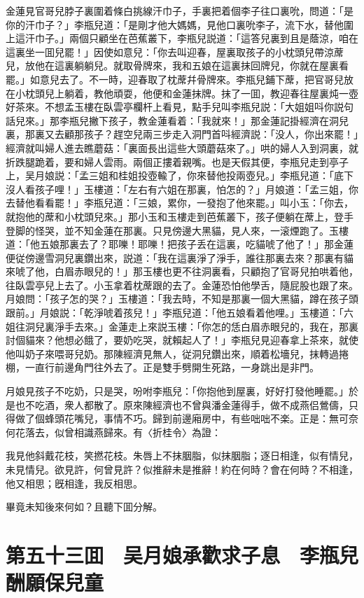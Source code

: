 金蓮見官哥兒脖子裏圍着條白挑線汗巾子，手裏把着個李子往口裏吮，問道：「是你的汗巾子？」李瓶兒道：「是剛才他大媽媽，見他口裏吮李子，流下水，替他圍上這汗巾子。」兩個只顧坐在芭蕉叢下，李瓶兒説道：「這答兒裏到且是蔭涼，咱在這裏坐一囬兒罷！」因使如意兒：「你去叫迎春，屋裏取孩子的小枕頭兒帶涼蓆兒，放他在這裏躺躺兒。就取骨牌來，我和五娘在這裏抹回牌兒，你就在屋裏看罷。」如意兒去了。不一時，迎春取了枕蓆幷骨牌來。李瓶兒鋪下蓆，把官哥兒放在小枕頭兒上躺着，教他頑耍，他便和金蓮抹牌。抹了一囬，教迎春往屋裏炖一壺好茶來。不想孟玉樓在臥雲亭欄杆上看見，點手兒叫李瓶兒説：「大姐姐呌你説句話兒來。」那李瓶兒撇下孩子，教金蓮看着：「我就來！」那金蓮記掛經濟在洞兒裏，那裏又去顧那孩子？趕空兒兩三步走入洞門首呌經濟説：「没人，你出來罷！」經濟就叫婦人進去瞧蘑菇：「裏面長出這些大頭蘑菇來了。」哄的婦人入到洞裏，就折跌腿跪着，要和婦人雲雨。兩個正摟着親嘴。也是天假其便，李瓶兒走到亭子上，吴月娘説：「孟三姐和桂姐投壺輸了，你來替他投兩壺兒。」李瓶兒道：「底下沒人看孩子哩！」玉樓道：「左右有六姐在那裏，怕怎的？」月娘道：「孟三姐，你去替他看看罷！」李瓶兒道：「三娘，累你，一發抱了他來罷。」叫小玉：「你去，就抱他的蓆和小枕頭兒來。」那小玉和玉樓走到芭蕉叢下，孩子便躺在蓆上，登手登脚的怪哭，並不知金蓮在那裏。只見傍邊大黑貓，見人來，一滚煙跑了。玉樓道：「他五娘那裏去了？耶嚛！耶嚛！把孩子丢在這裏，吃貓唬了他了！」那金蓮便従傍邊雪洞兒裏鑽出來，説道：「我在這裏淨了淨手，誰往那裏去來？那裏有貓來唬了他，白眉赤眼兒的！」那玉樓也更不往洞裏看，只顧抱了官哥兒拍哄着他，往臥雲亭兒上去了。小玉拿着枕蓆跟的去了。金蓮恐怕他學舌，隨屁股也跟了來。月娘問：「孩子怎的哭？」玉樓道：「我去時，不知是那裏一個大黑貓，蹲在孩子頭跟前。」月娘説：「乾淨唬着孩兒！」李瓶兒道：「他五娘看着他哩。」玉樓道：「六姐往洞兒裏淨手去來。」金蓮走上來説玉樓：「你怎的恁白眉赤眼兒的，我在，那裏討個貓來？他想必餓了，要奶吃哭，就賴起人了！」李瓶兒見迎春拿上茶來，就使他叫奶子來喂哥兒奶。那陳經濟見無人，従洞兒鑽出來，順着松墻兒，抹轉過捲棚，一直行前邊角門往外去了。正是雙手劈開生死路，一身跳出是非門。

月娘見孩子不吃奶，只是哭，吩咐李瓶兒：「你抱他到屋裏，好好打發他睡罷。」於是也不吃酒，衆人都散了。原來陳經濟也不曾與潘金蓮得手，做不成燕侣鶯儔，只得做了個蜂頭花嘴兒，事情不巧。歸到前邊廂房中，有些咄咄不楽。正是：無可奈何花落去，似曾相識燕歸來。有〈折桂令〉為證：

我見他斜戴花枝，笑撚花枝。朱唇上不抹胭脂，似抹胭脂；逐日相逢，似有情兒，未見情兒。欲見許，何曾見許？似推辭未是推辭！約在何時？會在何時？不相逢，他又相思；旣相逢，我反相思。

畢竟未知後來何如？且聽下囬分解。

\chapter*{第五十三囬　吴月娘承歡求子息　李瓶兒酬願保兒童}


